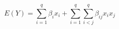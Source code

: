 

\[
E(Y) = \sum_{i=1}^{q}{\beta_{i}x_{i}} + \sum_{i=1}^{q}{\sum_{i < j}^{q}{\beta_{ij}x_{i}x_{j}}}
\]


